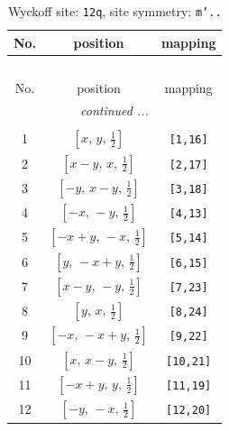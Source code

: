 \documentclass[fleqn,8pt]{jsarticle}
\begin{document}
\begin{longtable}{ccc}
\caption{Wyckoff site: {\tt 12q}, site symmetry: {\tt m'..}}
 \\
 \hline \hline
No. & position & mapping \\ \hline \endfirsthead

\multicolumn{2}{l}{\tablename\ \thetable{}} \\
 \hline \hline
No. & position & mapping \\ \hline \endhead

 \hline \hline
\multicolumn{2}{r}{\footnotesize\it continued ...} \\ \endfoot

 \hline \hline
\multicolumn{2}{r}{} \\ \endlastfoot

1 & $\left[ x,\, y,\, \frac{1}{2} \right]$ & {\tt [1,16]} \\ \hline
2 & $\left[ x - y,\, x,\, \frac{1}{2} \right]$ & {\tt [2,17]} \\ \hline
3 & $\left[ - y,\, x - y,\, \frac{1}{2} \right]$ & {\tt [3,18]} \\ \hline
4 & $\left[ - x,\, - y,\, \frac{1}{2} \right]$ & {\tt [4,13]} \\ \hline
5 & $\left[ - x + y,\, - x,\, \frac{1}{2} \right]$ & {\tt [5,14]} \\ \hline
6 & $\left[ y,\, - x + y,\, \frac{1}{2} \right]$ & {\tt [6,15]} \\ \hline
7 & $\left[ x - y,\, - y,\, \frac{1}{2} \right]$ & {\tt [7,23]} \\ \hline
8 & $\left[ y,\, x,\, \frac{1}{2} \right]$ & {\tt [8,24]} \\ \hline
9 & $\left[ - x,\, - x + y,\, \frac{1}{2} \right]$ & {\tt [9,22]} \\ \hline
10 & $\left[ x,\, x - y,\, \frac{1}{2} \right]$ & {\tt [10,21]} \\ \hline
11 & $\left[ - x + y,\, y,\, \frac{1}{2} \right]$ & {\tt [11,19]} \\ \hline
12 & $\left[ - y,\, - x,\, \frac{1}{2} \right]$ & {\tt [12,20]} \\
\end{longtable}
\renewcommand{\arraystretch}{1.2}
\end{document}
